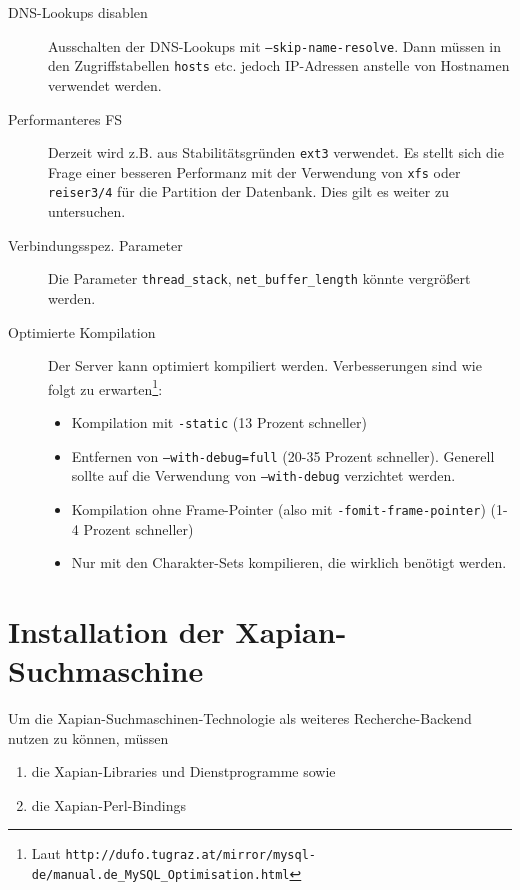 \documentclass[11pt, twoside, a4paper, BCOR8mm, DIV12, bibtotoc,idxtotoc]{scrbook}
\begin{document}
\begin{description}
\item[DNS-Lookups disablen] Ausschalten der DNS-Lookups mit
  \texttt{--skip-name-resolve}. Dann müssen in den Zugriffstabellen
  \texttt{hosts} etc. jedoch IP-Adressen anstelle von Hostnamen
  verwendet werden.
\item[Performanteres FS] Derzeit wird z.B. aus Stabilitätsgründen
  \texttt{ext3} verwendet. Es stellt sich die Frage einer besseren
  Performanz mit der Verwendung von \texttt{xfs} oder
  \texttt{reiser3/4} für die Partition der Datenbank. Dies gilt es
  weiter zu untersuchen.
\item[Verbindungsspez. Parameter] Die Parameter \texttt{thread\_stack},
  \texttt{net\_buffer\_length} könnte ver\-grö\-ßert werden.
\item[Optimierte Kompilation] Der Server kann optimiert kompiliert
  werden. Verbesserungen sind wie folgt zu erwarten\footnote{Laut
    \texttt{http://dufo.tugraz.at/mirror/mysql-de/manual.de\_MySQL\_Optimisation.html}}:

  \begin{itemize}
    \item Kompilation mit \texttt{-static} (13 Prozent schneller)
    \item Entfernen von \texttt{--with-debug=full} (20-35 Prozent
      schneller). Generell sollte auf die Verwendung von \texttt{--with-debug} verzichtet
      werden.
    \item Kompilation ohne Frame-Pointer (also mit
      \texttt{-fomit-frame-pointer}) (1-4 Prozent schneller)
    \item Nur mit den Charakter-Sets kompilieren, die wirklich benötigt werden. 
  \end{itemize}
\end{description}



\section{Installation der Xapian-Suchmaschine}
\label{sec:instxapian}

Um die Xapian-Suchmaschinen-Technologie als weiteres Recherche-Backend
nutzen zu können, müssen

\begin{enumerate}
\item die Xapian-Libraries und Dienstprogramme sowie
\item die Xapian-Perl-Bindings
\end{enumerate}
\end{document}

